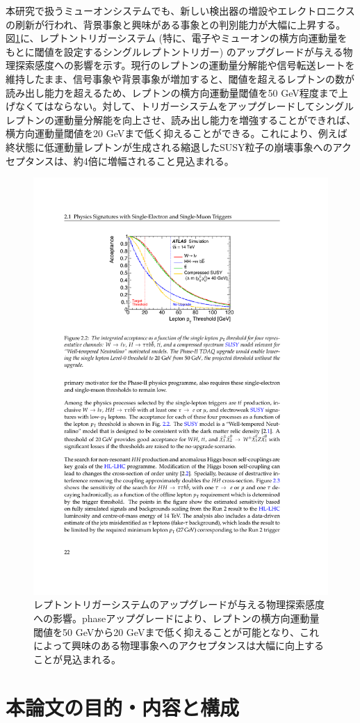 本研究で扱うミューオンシステムでも、新しい検出器の増設やエレクトロニクスの刷新が行われ、背景事象と興味がある事象との判別能力が大幅に上昇する。
図\ref{Ptthreshold}に、レプトントリガーシステム (特に、電子やミューオンの横方向運動量をもとに閾値を設定するシングルレプトントリガー) のアップグレードが与える物理探索感度への影響を示す。現行のレプトンの運動量分解能や信号転送レートを維持したまま、信号事象や背景事象が増加すると、閾値を超えるレプトンの数が読み出し能力を超えるため、レプトンの横方向運動量閾値を50 GeV程度まで上げなくてはならない。対して、トリガーシステムをアップグレードしてシングルレプトンの運動量分解能を向上させ、読み出し能力を増強することができれば、横方向運動量閾値を20 GeVまで低く抑えることができる。これにより、例えば終状態に低運動量レプトンが生成される縮退したSUSY粒子の崩壊事象へのアクセプタンスは、約4倍に増幅されること見込まれる。

\begin{figure} 
\centering
\includegraphics[width=16cm]{fig/Intro/Ptthreshold.pdf}
\caption{レプトントリガーシステムのアップグレードが与える物理探索感度への影響\cite{tdr_phase2tdaq_2017020}。phase\two アップグレードにより、レプトンの横方向運動量閾値を50 GeVから20 GeVまで低く抑えることが可能となり、これによって興味のある物理事象へのアクセプタンスは大幅に向上することが見込まれる。}
\label{Ptthreshold}
\end{figure}


\section{本論文の目的・内容と構成}
\label{sec_intro_purpose}





